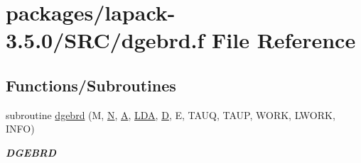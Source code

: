 \hypertarget{dgebrd_8f}{}\section{packages/lapack-\/3.5.0/\+S\+R\+C/dgebrd.f File Reference}
\label{dgebrd_8f}
\subsection*{Functions/\+Subroutines}
\begin{DoxyCompactItemize}
\item 
subroutine \hyperlink{group__doubleGEcomputational_ga9c735b94f840f927f8085fd23f3ee2e6}{dgebrd} (M, \hyperlink{polmisc_8c_a0240ac851181b84ac374872dc5434ee4}{N}, \hyperlink{classA}{A}, \hyperlink{example__user_8c_ae946da542ce0db94dced19b2ecefd1aa}{L\+D\+A}, \hyperlink{odrpack_8h_a7dae6ea403d00f3687f24a874e67d139}{D}, E, T\+A\+U\+Q, T\+A\+U\+P, W\+O\+R\+K, L\+W\+O\+R\+K, I\+N\+F\+O)
\begin{DoxyCompactList}\small\item\em {\bfseries D\+G\+E\+B\+R\+D} \end{DoxyCompactList}\end{DoxyCompactItemize}
